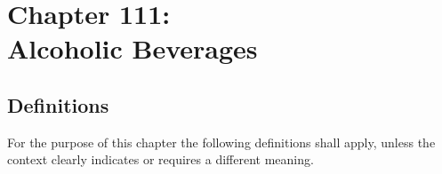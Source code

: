 \chapter*{Chapter 111: \\
	Alcoholic Beverages}
    \vspace{-1cm}
    \minitoc
    \pagebreak


\section{Definitions}
For the purpose of this chapter the following definitions shall apply, unless the context clearly indicates or requires a different meaning.

